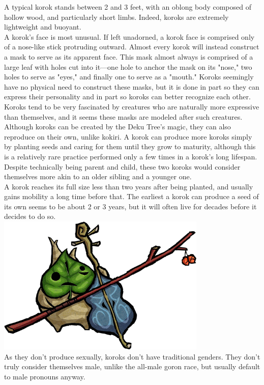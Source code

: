 \documentclass[10pt,twoside,twocolumn,openany]{book}
\begin{document}
A typical korok stands between 2 and 3 feet, with an oblong body composed of hollow wood, and particularly short limbs. Indeed, koroks are extremely lightweight and buoyant.\\
A korok's face is most unusual. If left unadorned, a korok face is comprised only of a nose-like stick protruding outward. Almost every korok will instead construct a mask to serve as its apparent face. This mask almost always is comprised of a large leaf with holes cut into it—one hole to anchor the mask on its "nose," two holes to serve as "eyes," and finally one to serve as a "mouth." Koroks seemingly have no physical need to construct these masks, but it is done in part so they can express their personality and in part so koroks can better recognize each other. Koroks tend to be very fascinated by creatures who are naturally more expressive than themselves, and it seems these masks are modeled after such creatures.\\
Although koroks can be created by the Deku Tree's magic, they can also reproduce on their own, unlike kokiri. A korok can produce more koroks simply by planting seeds and caring for them until they grow to maturity, although this is a relatively rare practice performed only a few times in a korok's long lifespan. Despite technically being parent and child, these two koroks would consider themselves more akin to an older sibling and a younger one.\\
A korok reaches its full size less than two years after being planted, and usually gains mobility a long time before that. The earliest a korok can produce a seed of its own seems to be about 2 or 3 years, but it will often live for decades before it decides to do so.\\
\includegraphics[width=100mm,scale=0.5]{makar.png} \\
As they don't produce sexually, koroks don't have traditional genders. They don't truly consider themselves male, unlike the all-male goron race, but usually default to male pronouns anyway.
\end{document}
